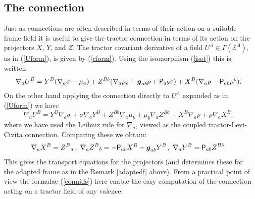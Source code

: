 \documentclass[a4paper,12pt]{amsart}
\def\Cal{\mathcal}
\newcommand{\V}{\mbox{\sf P}}
\newcommand{\ce}{{\Cal E}}
\def\bg{\mbox{\boldmath $g$}}
\newcommand{\si}{\sigma}
\theoremstyle{remark}
\newcommand{\nn}[1]{(\ref{#1})}
\newcommand{\nd}{\nabla}
\begin{document}
\subsection{The connection} 
Just as connections are often described in terms of their action on a
suitable frame field it is useful to give the tractor connection in
terms of its action on the projectors $X$, $Y$, and $Z$. The tractor
covariant derivative of a field $U^A\in \Gamma(\ce^A)$, as in
\nn{Uform}, is given by \nn{cform}. Using the isomorphism \nn{isot} this 
is written
$$
\nabla_a U^B=  Y^B(\nabla_a \si-\mu_a) + Z^{Bb}(\nabla_a\mu_b +\bg_{ab} \rho +\V_{ab}\si)+X^B(\nabla_a \rho-\V_{ab}\mu^b) .
$$ 
On the other hand applying the connection directly to $U^A$
expanded as in \nn{Uform} we have 
$$
\nabla_a U^B= Y^B\nabla_a \si + \si \nabla_a Y^B + Z^{Bb}\nabla_a\mu_b +\mu_b\nabla_a Z^{Bb} +X^B\nabla_a \rho + \rho \nabla_a X^B,
$$ 
where we have used the Leibniz rule for $\nabla_a$, viewed as the
coupled tractor-Levi-Civita connection. Comparing these we obtain:
\begin{equation}\label{connids}
\nd_aX^B=Z^B{}_{a}\,, \hspace{1mm}
\nd_aZ^B{}_{b}=-\V_{ab}X^B-\bg_{ab}Y^B\,,\hspace{1mm} \nd_aY^B=\V_{ab}Z^{Bb} .
\end{equation}
This gives the transport equations for the projectors (and determines
these for the adapted frame as in the Remark \ref{adaptedf}
above). From a practical point of view the formulae \nn{connids} here
enable the easy computation of the connection acting on a tractor field of
any valence. 
\end{document}
